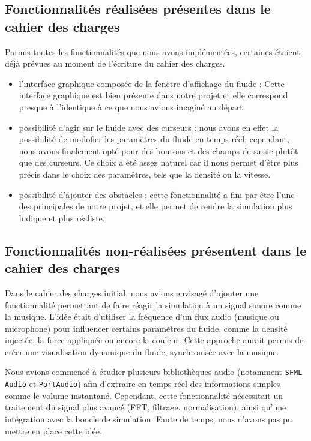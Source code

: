 \documentclass[a4paper]{article}
\begin{document}
\subsection{Fonctionnalités réalisées présentes dans le cahier des charges}


\hspace*{\parindent} Parmis toutes les fonctionnalités que nous avons implémentées, certaines étaient déjà prévues au moment de l'écriture du cahier des charges.
\begin{itemize}
  \item l'interface graphique composée de la fenêtre d'affichage du fluide : Cette interface graphique est bien présente dans notre projet et elle correspond presque à l'identique à ce que nous avions imaginé au départ.

  \item possibilité d'agir sur le fluide avec des curseurs : nous avons en effet la possibilité de modofier les paramêtres du fluide en temps réel, cependant, nous avons finalement opté pour des boutons et des champs de saisie plutôt que des curseurs. Ce choix a été assez naturel car il nous permet d'étre plus précis dans le choix des paramêtres, tels que la densité ou la vitesse.
  
  \item possibilité d'ajouter des obstacles : cette fonctionnalité a fini par être l'une des principales de notre projet, et elle permet de rendre la simulation plus ludique et plus réaliste.
\end{itemize}


\subsection{Fonctionnalités non-réalisées présentent dans le cahier des charges}

\hspace*{\parindent} Dans le cahier des charges initial, nous avions envisagé d’ajouter une fonctionnalité permettant 
de faire réagir la simulation à un signal sonore comme la musique. L’idée était d’utiliser la fréquence 
d’un flux audio (musique ou microphone) pour influencer certains paramètres du fluide, comme 
la densité injectée, la force appliquée ou encore la couleur. Cette approche aurait permis de créer 
une visualisation dynamique du fluide, synchronisée avec la musique.

Nous avions commencé à étudier plusieurs bibliothèques audio (notamment \texttt{SFML Audio} 
et \texttt{PortAudio}) afin d’extraire en temps réel des informations simples comme le volume 
instantané. Cependant, cette fonctionnalité nécessitait un traitement du signal plus avancé 
(FFT, filtrage, normalisation), ainsi qu’une intégration avec la boucle de simulation. 
Faute de temps, nous n’avons pas pu mettre en place cette idée.
\end{document}
